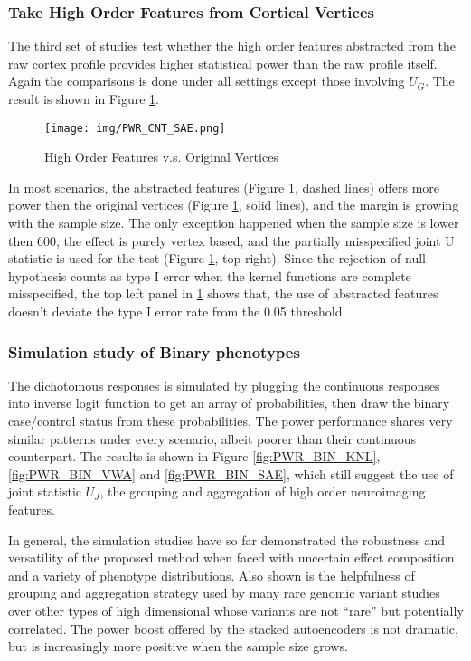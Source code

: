 \subsubsection{Take High Order Features from Cortical Vertices}
The third set of studies test whether the high order features abstracted from the raw cortex profile provides higher statistical power than the raw profile itself. Again the comparisons is done under all settings except those involving $U_G$. The result is shown in Figure \ref{fig:PWR_CNT_SAE}.
\begin{figure}[!htbp]
\centering
\texttt{[image: img/PWR\_CNT\_SAE.png]}
\caption{High Order Features v.s. Original Vertices}
\label{fig:PWR_CNT_SAE}
\end{figure}
In most scenarios, the abstracted features (Figure \ref{fig:PWR_CNT_SAE}, dashed lines) offers more power then the original vertices (Figure \ref{fig:PWR_CNT_SAE}, solid lines), and the margin is growing with the sample size. The only exception happened when the sample size is lower then 600, the effect is purely vertex based, and the partially misspecified joint U statistic is used for the test (Figure \ref{fig:PWR_CNT_SAE}, top right). Since the rejection of null hypothesis counts as type I error when the kernel functions are complete misspecified, the top left panel in \ref{fig:PWR_CNT_SAE} shows that, the use of abstracted features doesn't deviate the type I error rate from the 0.05 threshold.

\subsubsection{Simulation study of Binary phenotypes}
The dichotomous responses is simulated by plugging the continuous responses into inverse logit function to get an array of probabilities, then draw the binary case/control status from these probabilities. The power performance shares very similar patterns under every scenario, albeit poorer than their continuous counterpart. The results is shown in Figure \ref{fig:PWR_BIN_KNL}, \ref{fig:PWR_BIN_VWA} and \ref{fig:PWR_BIN_SAE}, which still suggest the use of joint statistic $U_J$, the grouping and aggregation of high order neuroimaging features.

In general, the simulation studies have so far demonstrated the robustness and versatility of the proposed method when faced with uncertain effect composition and a variety of phenotype distributions. Also shown is the helpfulness of grouping and aggregation strategy used by many rare genomic variant studies over other types of high dimensional whose variants are not ``rare'' but potentially correlated. The power boost offered by the stacked autoencoders is not dramatic, but is increasingly more positive when the sample size grows.

